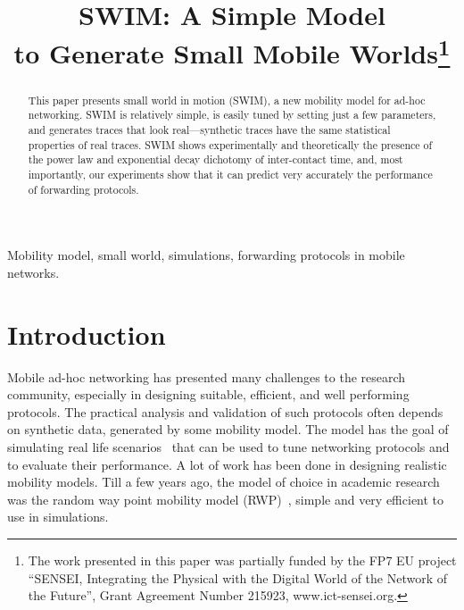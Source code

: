 \documentclass[conference]{IEEEtran}
\begin{document}
\title{SWIM: A Simple Model\\ to Generate Small Mobile Worlds\thanks{The work presented in this paper was partially funded by the FP7 EU project ``SENSEI, Integrating the Physical with the Digital World of the Network of the Future'', Grant Agreement Number 215923, www.ict-sensei.org.}}

\author{
}

\maketitle

\begin{abstract}
This paper presents small world in motion (SWIM), a new mobility model for ad-hoc networking. SWIM is relatively simple, is easily tuned by setting just a few parameters, and generates traces that look real---synthetic traces have the same statistical properties of real traces. SWIM shows experimentally and theoretically the presence of the power law and exponential decay dichotomy of inter-contact time, and, most importantly, our experiments show that it can predict very accurately the performance of forwarding protocols.
\end{abstract}

\begin{IEEEkeywords}
Mobility model, small world, simulations, forwarding protocols in mobile networks.
\end{IEEEkeywords}

\section{Introduction}
\label{sec:intro}
Mobile ad-hoc networking has presented many challenges to the research community,
especially in designing suitable, efficient, and well performing protocols.
The practical analysis and validation of such protocols often depends on
synthetic data, generated by some mobility model. The model has the goal of
simulating real life scenarios~\cite{camp02wcmc} that can be used to tune
networking protocols and to evaluate their performance. A lot of work has been
done in designing realistic mobility models. Till a few years ago, the model of
choice in academic research was the random way point mobility model
(RWP)~\cite{rwp}, simple and very efficient to use in simulations.
\end{document}
